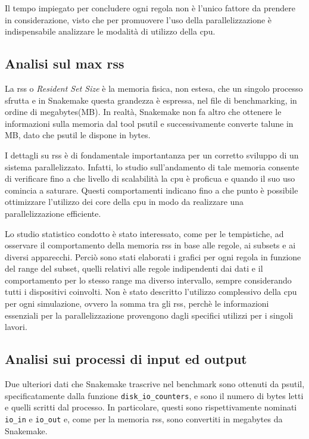 Il tempo impiegato per concludere ogni regola non è l'unico fattore da prendere in considerazione, visto che per promuovere l'uso della parallelizzazione è indispensabile analizzare le modalità di utilizzo della cpu. 

\subsection{Analisi sul max rss}
La rss o \textit{Resident Set Size} è la memoria fisica, non estesa, che un singolo processo sfrutta e in Snakemake questa grandezza è espressa, nel file di benchmarking, in ordine di megabytes(MB). 
In realtà, Snakemake non fa altro che ottenere le informazioni sulla memoria dal tool psutil e successivamente converte talune in MB, dato che psutil le dispone in bytes.

I dettagli su rss è di fondamentale importantanza per un corretto sviluppo di un sistema parallelizzato.
Infatti, lo studio sull'andamento di tale memoria consente di verificare fino a che livello di scalabilità la cpu è proficua e quando il suo uso comincia a saturare.
Questi comportamenti indicano fino a che punto è possibile ottimizzare l'utilizzo dei core della cpu in modo da realizzare una parallelizzazione efficiente.

Lo studio statistico condotto è stato interessato, come per le tempistiche, ad osservare il comportamento della memoria rss in base alle regole, ai subsets e ai diversi apparecchi.
Perciò sono stati elaborati i grafici per ogni regola in funzione del range del subset, quelli relativi alle regole indipendenti dai dati e il comportamento per lo stesso range ma diverso intervallo, sempre considerando tutti i dispositivi coinvolti.
Non è stato descritto l'utilizzo complessivo della cpu per ogni simulazione, ovvero la somma tra gli rss, perchè le informazioni essenziali per la parallelizzazione provengono dagli specifici utilizzi per i singoli lavori. 
    

\subsection{Analisi sui processi di input ed output} 
Due ulteriori dati che Snakemake trascrive nel benchmark sono ottenuti da psutil, specificatamente dalla funzione \verb!disk_io_counters!, e sono il numero di bytes letti e quelli scritti dal processo.
In particolare, questi sono rispettivamente nominati \verb!io_in! e \verb!io_out! e, come per la memoria rss, sono convertiti in megabytes da Snakemake. 

